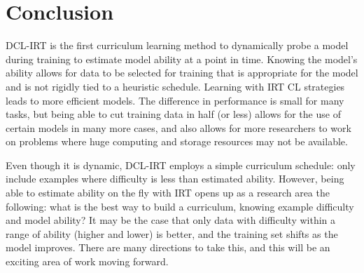 \documentclass[letterpaper]{article} %
\begin{document}
\section{Conclusion} 

DCL-IRT is the first curriculum learning method to dynamically probe a model during training to estimate model ability at a point in time.
Knowing the model's ability allows for data to be selected for training that is appropriate for the model and is not rigidly tied to a heuristic schedule.
Learning with IRT CL strategies leads to more efficient models.
The difference in performance is small for many tasks, but being able to cut training data in half (or less) allows for the use of certain models in many more cases, and also allows for more researchers to work on problems where huge computing and storage resources may not be available.

Even though it is dynamic, DCL-IRT employs a simple curriculum schedule: only include examples where difficulty is less than estimated ability.
However, being able to estimate ability on the fly with IRT opens up as a research area the following: what is the best way to build a curriculum, knowing example difficulty and model ability?
It may be the case that only data with difficulty within a range of ability (higher and lower) is better, and the training set shifts as the model improves.
There are many directions to take this, and this will be an exciting area of work moving forward.



\end{document}
